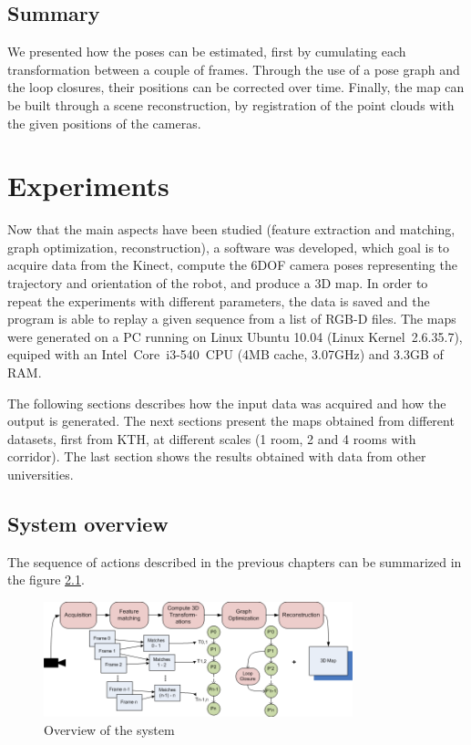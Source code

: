 \section{Summary}

We presented how the poses can be estimated, first by cumulating each transformation between a couple of frames. Through the use of a pose graph and the loop closures, their positions can be corrected over time. Finally, the map can be built through a scene reconstruction, by registration of the point clouds with the given positions of the cameras.

\chapter{Experiments}
\label{chap:experiments}

Now that the main aspects have been studied (feature extraction and matching, graph optimization, reconstruction), a software was developed, which goal is to acquire data from the Kinect, compute the 6DOF camera poses representing the trajectory and orientation of the robot, and produce a 3D map. In order to repeat the experiments with different parameters, the data is saved and the program is able to replay a given sequence from a list of RGB-D files. The maps were generated on a PC running on Linux Ubuntu 10.04 (Linux Kernel~2.6.35.7), equiped with an Intel~Core\texttrademark{}~i3-540~CPU (4MB cache, 3.07GHz) and 3.3GB of RAM.

The following sections describes how the input data was acquired and how the output is generated. The next sections present the maps obtained from different datasets, first from KTH, at different scales (1 room, 2 and 4 rooms with corridor). The last section shows the results obtained with data from other universities.

\section{System overview}

The sequence of actions described in the previous chapters can be summarized in the figure \ref{fig:system_overview}.

\begin{figure}[h!]
\begin{center}
\includegraphics[width=0.8\textwidth]{figures/overview}
\caption{Overview of the system}
\label{fig:system_overview}
\end{center}
\end{figure}

